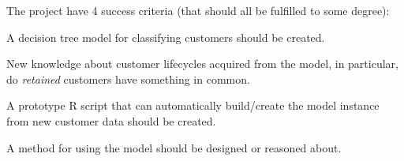 The project have 4 success criteria (that should all be fulfilled to some
degree):

\begin{enumerate*}
  \item A decision tree model for classifying customers should be created.
  \item New knowledge about customer lifecycles acquired from the model,
        in particular, do \textit{retained} customers have something in common.
  \item A prototype R script that can automatically build/create the model
        instance from new customer data should be created.
  \item A method for using the model should be designed or reasoned about.
\end{enumerate*}
